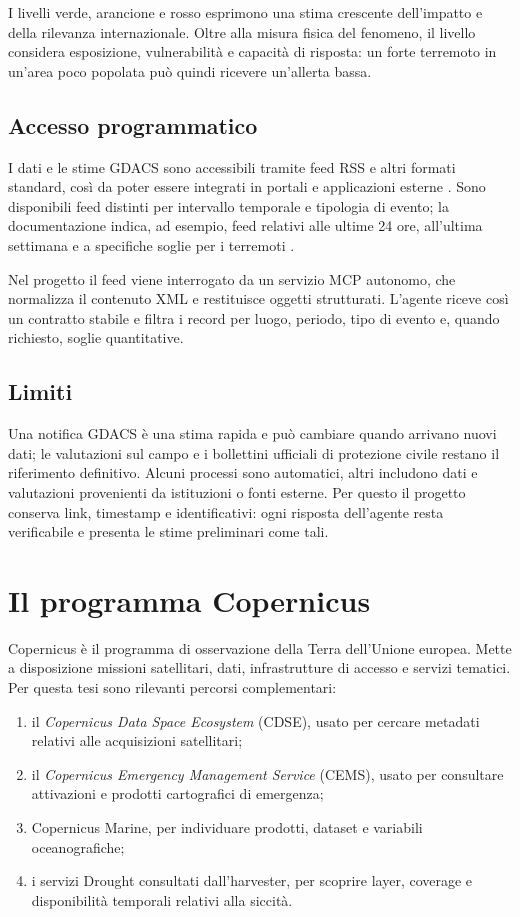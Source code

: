 I livelli verde, arancione e rosso esprimono una stima crescente dell'impatto e
della rilevanza internazionale. Oltre alla misura fisica del fenomeno, il livello
considera esposizione, vulnerabilità e capacità di risposta: un forte terremoto
in un'area poco popolata può quindi ricevere un'allerta bassa.

\subsection{Accesso programmatico}

I dati e le stime GDACS sono accessibili tramite feed RSS e altri formati
standard, così da poter essere integrati in portali e applicazioni esterne
\cite{gdacsOverview}. Sono disponibili feed distinti per intervallo temporale e
tipologia di evento; la documentazione indica, ad esempio, feed relativi alle
ultime 24 ore, all'ultima settimana e a specifiche soglie per i terremoti
\cite{gdacsFeeds}.

Nel progetto il feed viene interrogato da un servizio MCP autonomo, che
normalizza il contenuto XML e restituisce oggetti strutturati. L'agente riceve
così un contratto stabile e filtra i record per luogo, periodo, tipo di evento
e, quando richiesto, soglie quantitative.

\subsection{Limiti}

Una notifica GDACS è una stima rapida e può cambiare quando arrivano nuovi
dati; le valutazioni sul campo e i bollettini ufficiali di protezione civile
restano il riferimento definitivo. Alcuni processi sono automatici, altri
includono dati e valutazioni provenienti da istituzioni o fonti esterne. Per
questo il progetto conserva link, timestamp e identificativi: ogni risposta
dell'agente resta verificabile e presenta le stime preliminari come tali.

\section{Il programma Copernicus}

Copernicus è il programma di osservazione della Terra dell'Unione europea.
Mette a disposizione missioni satellitari, dati, infrastrutture di accesso e
servizi tematici. Per questa tesi sono rilevanti percorsi complementari:

\begin{enumerate}
    \item il \emph{Copernicus Data Space Ecosystem} (CDSE), usato per cercare
    metadati relativi alle acquisizioni satellitari;
    \item il \emph{Copernicus Emergency Management Service} (CEMS), usato per
    consultare attivazioni e prodotti cartografici di emergenza;
    \item Copernicus Marine, per individuare prodotti, dataset e variabili
    oceanografiche;
    \item i servizi Drought consultati dall'harvester, per scoprire layer,
    coverage e disponibilità temporali relativi alla siccità.
\end{enumerate}

